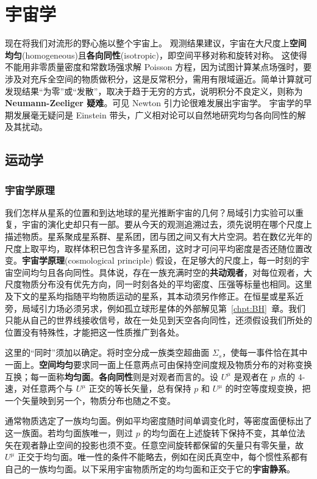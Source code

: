 \chapter{宇宙学}\label{chpt:cosmology}

现在将我们对流形的野心施以整个宇宙上。
观测结果建议，宇宙在大尺度上\textbf{空间均匀}(homogeneous)且\textbf{各向同性}(isotropic)，即空间平移对称和旋转对称。
这使得不能用非零质量密度和常数场强求解 Poisson 方程，因为试图计算某点场强时，要涉及对充斥全空间的物质做积分，这是反常积分，需用有限域逼近。简单计算就可发现结果“为零”或“发散”，取决于趋于无穷的方式，说明积分不良定义，则称为\textbf{Neumann-Zeeliger 疑难}。可见 Newton 引力论很难发展出宇宙学。
宇宙学的早期发展毫无疑问是 Einstein 带头，广义相对论可以自然地研究均匀各向同性的解及其扰动。

\section{运动学}\label{sec:cosmo-kinematics}

\subsection{宇宙学原理}

我们怎样从星系的位置和到达地球的星光推断宇宙的几何？局域引力实验可以重复，宇宙的演化史却只有一部。要从今天的观测追溯过去，须先说明在哪个尺度上描述物质。星系聚成星系群、星系团，团与团之间又有大片空洞。若在数亿光年的尺度上取平均，取样体积已包含许多星系团，这时才可问平均密度是否还随位置改变。\textbf{宇宙学原理}(cosmological principle) 假设，在足够大的尺度上，每一时刻的宇宙空间均匀且各向同性。具体说，存在一族充满时空的\textbf{共动观者}，对每位观者，大尺度物质分布没有优先方向，同一时刻各处的平均密度、压强等标量也相同。这里及下文的星系均指随平均物质运动的星系，其本动须另作修正。在恒星或星系近旁，局域引力场必须另求，例如孤立球形星体的外部解见第~\ref{chpt:BH}~章。我们只能从自己的世界线接收信号，故在一处见到天空各向同性，还须假设我们所处的位置没有特殊性，才能把这一性质推广到各处。

这里的“同时”须加以确定。将时空分成一族类空超曲面 $\Sigma_s$，使每一事件恰在其中一面上。\textbf{空间均匀}要求同一面上任意两点可由保持空间度规及物质分布的对称变换互换；每一面称\textbf{均匀面}。\textbf{各向同性}则是对观者而言的。设 $U^\mu$ 是观者在 $p$ 点的 4-速，对任意两个与 $U^\mu$ 正交的等长矢量，总有保持 $p$ 和 $U^\mu$ 的时空等度规变换，把一个矢量映到另一个，物质分布也随之不变。

通常物质选定了一族均匀面。例如平均密度随时间单调变化时，等密度面便标出了这一族面。若均匀面族唯一，则过 $p$ 的均匀面在上述旋转下保持不变，其单位法矢在观者静止空间的投影也须不变。任意空间旋转都保留的矢量只有零矢量，故 $U^\mu$ 正交于均匀面。唯一性的条件不能略去，例如在闵氏真空中，每个惯性系都有自己的一族均匀面。以下采用宇宙物质所定的均匀面和正交于它的\textbf{宇宙静系}。

